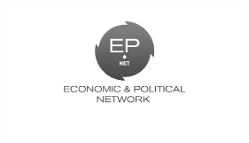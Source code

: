 \documentclass[a4paper]{article}
\begin{document}
%
%
%
%
%
%
%
%
%  
	\begin{center}
		\includegraphics[width=7cm]{logo}
	\end{center}
\end{document}
